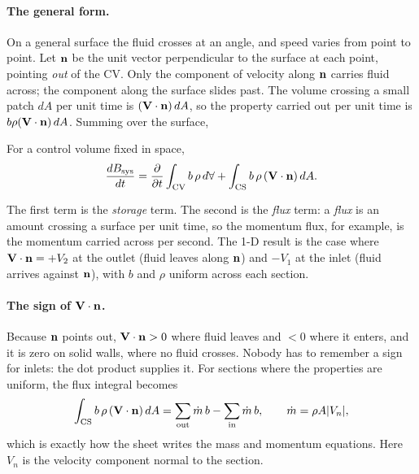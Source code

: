 \paragraph{The general form.} On a general surface the fluid crosses at an angle, and speed varies from point to point. Let $\mathbf{n}$ be the unit vector perpendicular to the surface at each point, pointing \emph{out} of the CV. Only the component of velocity along $\mathbf{n}$ carries fluid across; the component along the surface slides past. The volume crossing a small patch $dA$ per unit time is $(\mathbf{V}\cdot\mathbf{n})\,dA$, so the property carried out per unit time is $b\rho(\mathbf{V}\cdot\mathbf{n})\,dA$. Summing over the surface,

\begin{theorem}
For a control volume fixed in space,
\[
\frac{dB_\text{sys}}{dt} = \frac{\partial }{\partial t}\int_\text{CV} b\,\rho\, d\forall + \int_\text{CS} b\,\rho\,(\mathbf{V}\cdot\mathbf{n})\, dA .
\]
\end{theorem}

The first term is the \emph{storage} term. The second is the \emph{flux} term: a \emph{flux} is an amount crossing a surface per unit time, so the momentum flux, for example, is the momentum carried across per second. The 1-D result is the case where $\mathbf{V}\cdot\mathbf{n} = +V_2$ at the outlet (fluid leaves along $\mathbf{n}$) and $-V_1$ at the inlet (fluid arrives against $\mathbf{n}$), with $b$ and $\rho$ uniform across each section.

\paragraph{The sign of $\mathbf{V}\cdot\mathbf{n}$.} Because $\mathbf{n}$ points out, $\mathbf{V}\cdot\mathbf{n} > 0$ where fluid leaves and $< 0$ where it enters, and it is zero on solid walls, where no fluid crosses. Nobody has to remember a sign for inlets: the dot product supplies it. For sections where the properties are uniform, the flux integral becomes
\[
\int_\text{CS} b\,\rho\,(\mathbf{V}\cdot\mathbf{n})\,dA = \sum_\text{out}\dot m\, b - \sum_\text{in}\dot m\, b, \qquad \dot m = \rho A |V_n| ,
\]
which is exactly how the sheet writes the mass and momentum equations. Here $V_n$ is the velocity component normal to the section.

